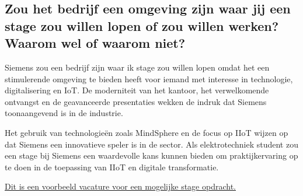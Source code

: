 \subsection{Zou het bedrijf een omgeving zijn waar jij een stage zou willen lopen of zou willen werken? Waarom wel of waarom niet?}

Siemens zou een bedrijf zijn waar ik stage zou willen lopen omdat het een stimulerende omgeving te bieden heeft voor iemand met interesse in technologie, digitalisering en IoT. De moderniteit van het kantoor, het verwelkomende ontvangst en de geavanceerde presentaties wekken de indruk dat Siemens toonaangevend is in de industrie.

Het gebruik van technologieën zoals MindSphere en de focus op IIoT wijzen op dat Siemens een innovatieve speler is in de sector. Als elektrotechniek student zou een stage bij Siemens een waardevolle kans kunnen bieden om praktijkervaring op te doen in de toepassing van IIoT en digitale transformatie. 

\href{https://jobs.siemens.com/careers/job/563156116443106?microsite=siemens.com}{Dit is een voorbeeld vacature voor een mogelijke stage opdracht.}